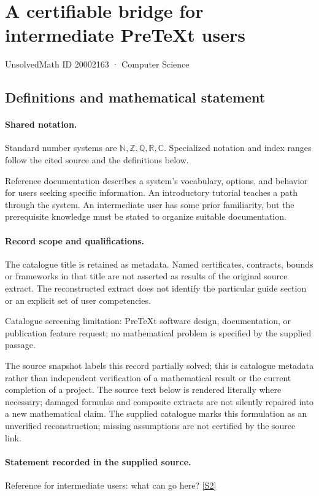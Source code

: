 \documentclass[11pt]{article}
\newcommand{\sref}[2]{\hyperlink{source:#1:#2}{[S#2]}}
\begin{document}
\setcounter{section}{20002162}
\section{A certifiable bridge for intermediate PreTeXt users}\label{20002163}
{\small\sffamily UnsolvedMath ID 20002163 · Computer Science}
\subsection{Definitions and mathematical statement}

\paragraph{Shared notation.}Standard number systems are $\mathbb N,\mathbb Z,\mathbb Q,\mathbb R,\mathbb C$. Specialized notation and index ranges follow the cited source and the definitions below.


Reference documentation describes a system's vocabulary, options, and behavior for users seeking specific information. An introductory tutorial teaches a path through the system. An intermediate user has some prior familiarity, but the prerequisite knowledge must be stated to organize suitable documentation.
\paragraph{Record scope and qualifications.}
The catalogue title is retained as metadata. Named certificates, contracts, bounds or frameworks in that title are not asserted as results of the original source extract.
The reconstructed extract does not identify the particular guide section or an explicit set of user competencies.

Catalogue screening limitation: PreTeXt software design, documentation, or publication feature request; no mathematical problem is specified by the supplied passage.

The source snapshot labels this record partially solved; this is catalogue metadata rather than independent verification of a mathematical result or the current completion of a project.
The source text below is rendered literally where necessary; damaged formulas and composite extracts are not silently repaired into a new mathematical claim.
The supplied catalogue marks this formulation as an unverified reconstruction; missing assumptions are not certified by the source link.
\paragraph{Statement recorded in the supplied source.}
Reference for intermediate users: what can go here? \sref{20002163}{2}
\end{document}

